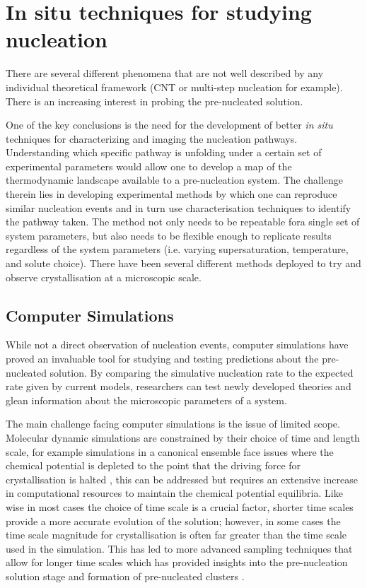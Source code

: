 \section{In situ techniques for studying nucleation}
There are several different phenomena \cite{Fu2021, Karthika2016} 
that are not well described by any individual theoretical framework 
(CNT or multi-step nucleation for example). There is an increasing 
interest in probing the pre-nucleated solution.

One of the key conclusions is the need for the development of 
better \textit{in situ} techniques for characterizing and 
imaging the nucleation pathways. Understanding which specific 
pathway is unfolding under a certain set of experimental 
parameters would allow one to develop a map of the thermodynamic 
landscape available to a pre-nucleation system. The challenge 
therein lies in developing experimental methods by which one can 
reproduce similar nucleation events and in turn use 
characterisation techniques to identify the pathway taken. The 
method not only needs to be repeatable fora single set of system 
parameters, but also needs to be flexible enough to replicate 
results regardless of the system parameters (i.e. varying 
supersaturation, temperature, and solute choice). There have 
been several different methods deployed to try and observe 
crystallisation at a microscopic scale.

\subsection{Computer Simulations}
While not a direct observation of nucleation events, computer
simulations have proved an invaluable tool for studying and 
testing predictions about the pre-nucleated solution. By 
comparing the simulative nucleation rate to the expected 
rate given by current models, researchers can test newly 
developed theories and glean information about the microscopic
parameters of a system. 

The main challenge facing computer simulations is the issue
of limited scope. Molecular dynamic simulations are constrained
by their choice of time and length scale, for example simulations
in a canonical ensemble face issues where the chemical potential
is depleted to the point that the driving force for crystallisation
is halted \cite{DuranOlivencia2015, Finney2023}, this can be 
addressed but requires an extensive increase in computational 
resources to maintain the chemical potential equilibria. Like wise
in most cases the choice of time scale is a crucial factor, shorter
time scales provide a more accurate evolution of the solution; 
however, in some cases the time scale magnitude for crystallisation
is often far greater than the time scale used in the simulation. This
has led to more advanced sampling techniques that allow for longer 
time scales which has provided insights into the pre-nucleation 
solution stage and formation of pre-nucleated clusters \cite{Finney2023}.
 
